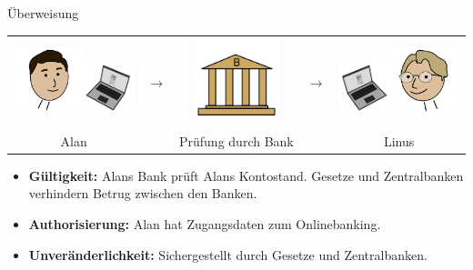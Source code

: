 \documentclass[aspectratio=169]{beamer}
\begin{document}
\begin{frame}{Überweisung}
    \begin{center}
        \begin{tabular}{ccccc}
            \includegraphics[width=2cm]{../icons/Alan}\includegraphics[width=1.5cm]{../icons/ComputerLeft} & {\Huge$\longrightarrow$} & \includegraphics[width=2.5cm]{../icons/Bank} & {\Huge$\longrightarrow$} & \includegraphics[width=1.5cm]{../icons/ComputerRight}\includegraphics[width=2cm]{../icons/Linus}\\
            Alan & & Prüfung durch Bank & & Linus\\
        \end{tabular}
    \end{center}
    \vspace{0.5cm}

    \pause
    \begin{itemize}
        \item \textbf{Gültigkeit:} Alans Bank prüft Alans Kontostand. Gesetze und Zentralbanken verhindern Betrug zwischen den Banken.
        \item \textbf{Authorisierung:} Alan hat Zugangsdaten zum Onlinebanking.
        \item \textbf{Unveränderlichkeit:} Sichergestellt durch Gesetze und Zentralbanken.
    \end{itemize}
\end{frame}
\end{document}
